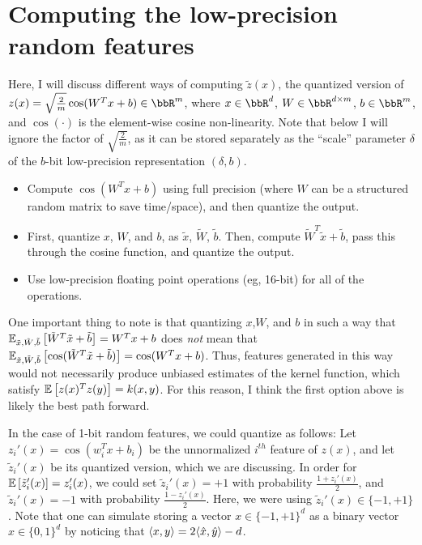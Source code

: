 \documentclass[12pt]{article}
\newcommand{\tx}{\tilde{x}}
\newcommand{\tW}{\tilde{W}}
\newcommand{\tb}{\tilde{b}}
\newcommand{\tz}{\tilde{z}}
\begin{document}
\section{Computing the low-precision random features}
Here, I will discuss different ways of computing $\tz(x)$, the quantized version of $z(x) = \sqrt{\frac{2}{m}} \cos(W^T x + b) \in \RR^m$, where $x\in \RR^d$, $W\in \RR^{d\times m}$, $b \in \RR^m$, and $\cos(\cdot)$ is the element-wise cosine non-linearity. Note that below I will ignore the factor of $\sqrt{\frac{2}{m}}$, as it can be stored separately as the ``scale'' parameter $\delta$ of the $b$-bit low-precision representation $(\delta,b)$.
\begin{itemize}
	\item Compute $\cos(W^Tx + b)$ using full precision (where $W$ can be a structured random matrix to save time/space), and then quantize the output.
	\item First, quantize $x$, $W$, and $b$, as $\tx$, $\tW$, $\tb$.  Then, compute $\tW^T \tx + \tb$, pass this 
	through the cosine function, and quantize the output.
	\item Use low-precision floating point operations (eg, 16-bit) for all of the operations.
\end{itemize}
One important thing to note is that quantizing $x$,$W$, and $b$ in such a way that $\expect{\tx,\tW,\tb}{\tW^T\tx + \tb} = W^Tx+b$ does \textit{not} mean that $\expect{\tx,\tW,\tb}{\cos(\tW^T\tx + \tb)} = \cos(W^Tx + b)$.  Thus, features generated in this way would not necessarily produce unbiased estimates of the kernel function, which satisfy $\expect{}{z(x)^Tz(y)} = k(x,y)$.
For this reason, I think the first option above is likely the best path forward.

In the case of 1-bit random features, we could quantize as follows: Let $z_i'(x) = \cos(w_i^T x + b_i)$ be the unnormalized $i^{th}$ feature of $z(x)$, and let $\tz_i'(x)$ be its quantized version, which we are discussing.  
In order for $\expect{}{\tz_i'(x)} = z_i'(x)$, we could set $\tz_i'(x) = +1$ with probability $\frac{1 + z_i'(x)}{2}$, and $\tz_i'(x) = -1$ with probability $\frac{1 - z_i'(x)}{2}$.  Here, we were using $\tz_i'(x) \in \{-1,+1\}$.
Note that one can simulate storing a vector $x \in \{-1,+1\}^d$ as a binary vector $\hat{x}\in \{0,1\}^d$ by noticing that 
$\langle x,y \rangle= 2 \langle \hat{x},\hat{y} \rangle - d$.
\end{document}
